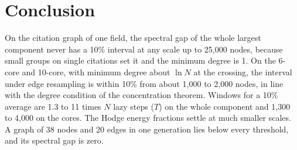 \documentclass[11pt]{article}
\begin{document}
\section{Conclusion}
On the citation graph of one field, the spectral gap of the whole largest component never has a 10\%
interval at any scale up to 25,000 nodes, because small groups on single citations set it and the
minimum degree is 1. On the 6-core and 10-core, with minimum degree about $\ln N$ at the crossing,
the interval under edge resampling is within 10\% from about 1,000 to 2,000 nodes, in line with the
degree condition of the concentration theorem. Windows for a 10\% average are 1.3 to 11 times $N$ lazy steps ($T$) on the
whole component and 1,300 to 4,000 on the cores. The Hodge energy fractions settle at much smaller
scales. A graph of 38 nodes and 20 edges in one generation lies below every threshold, and its
spectral gap is zero.



\end{document}
